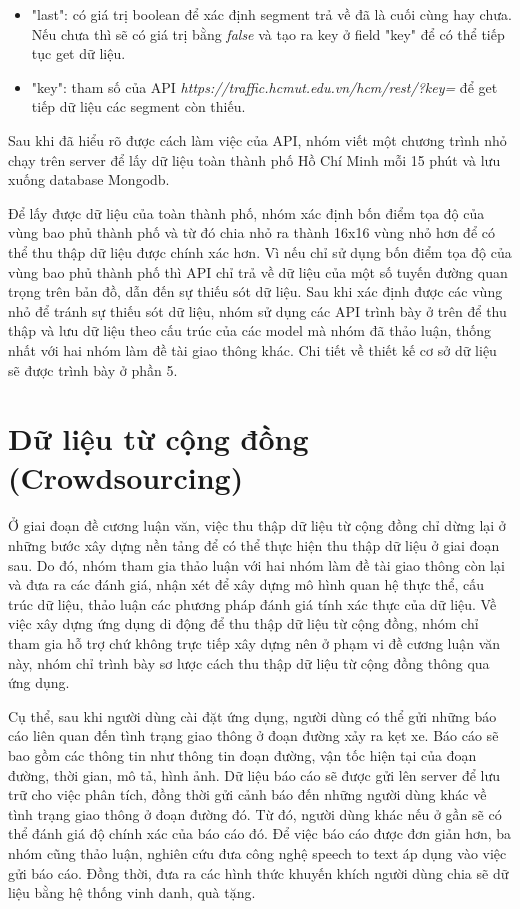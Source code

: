\begin{itemize}
\begin{itemize}
    \item "last": có giá trị boolean để xác định segment trả về đã là cuối cùng hay chưa. Nếu chưa thì sẽ có giá trị bằng \textit{false} và tạo ra key ở field "key" để có thể tiếp tục get dữ liệu.
    \item "key": tham số của API \textit{https://traffic.hcmut.edu.vn/hcm/rest/?key=} để get tiếp dữ liệu các segment còn thiếu.
    \end{itemize}
\end{itemize}
Sau khi đã hiểu rõ được cách làm việc của API, nhóm viết một chương trình nhỏ chạy trên server để lấy dữ liệu toàn thành phố Hồ Chí Minh mỗi 15 phút và lưu xuống database Mongodb.

Để lấy được dữ liệu của toàn thành phố, nhóm xác định bốn điểm tọa độ của vùng bao phủ thành phố và từ đó chia nhỏ ra thành 16x16 vùng nhỏ hơn để có thể thu thập dữ liệu được chính xác hơn. Vì nếu chỉ sử dụng bốn điểm tọa độ của vùng bao phủ thành phố thì API chỉ trả về dữ liệu của một số tuyến đường quan trọng trên bản đồ, dẫn đến sự thiếu sót dữ liệu. Sau khi xác định được các vùng nhỏ để tránh sự thiếu sót dữ liệu, nhóm sử dụng các API trình bày ở trên để thu thập và lưu dữ liệu theo cấu trúc của các model mà nhóm đã thảo luận, thống nhất với hai nhóm làm đề tài giao thông khác. Chi tiết về thiết kế cơ sở dữ liệu sẽ được trình bày ở phần 5.

\section{Dữ liệu từ cộng đồng (Crowdsourcing)}
Ở giai đoạn đề cương luận văn, việc thu thập dữ liệu từ cộng đồng chỉ dừng lại ở những bước xây dựng nền tảng để có thể thực hiện thu thập dữ liệu ở giai đoạn sau. Do đó, nhóm tham gia thảo luận với hai nhóm làm đề tài giao thông còn lại và đưa ra các đánh giá, nhận xét để xây dựng mô hình quan hệ thực thể, cấu trúc dữ liệu, thảo luận các phương pháp đánh giá tính xác thực của dữ liệu. Về việc xây dựng ứng dụng di động để thu thập dữ liệu từ cộng đồng, nhóm chỉ tham gia hỗ trợ chứ không trực tiếp xây dựng nên ở phạm vi đề cương luận văn này, nhóm chỉ trình bày sơ lược cách thu thập dữ liệu từ cộng đồng thông qua ứng dụng.

Cụ thể, sau khi người dùng cài đặt ứng dụng, người dùng có thể gửi những báo cáo liên quan đến tình trạng giao thông ở đoạn đường xảy ra kẹt xe. Báo cáo sẽ bao gồm các thông tin như thông tin đoạn đường, vận tốc hiện tại của đoạn đường, thời gian, mô tả, hình ảnh. Dữ liệu báo cáo sẽ được gửi lên server để lưu trữ cho việc phân tích, đồng thời gửi cảnh báo đến những người dùng khác về tình trạng giao thông ở đoạn đường đó. Từ đó, người dùng khác nếu ở gần sẽ có thể đánh giá độ chính xác của báo cáo đó. Để việc báo cáo được đơn giản hơn, ba nhóm cũng thảo luận, nghiên cứu đưa công nghệ speech to text áp dụng vào việc gửi báo cáo. Đồng thời, đưa ra các hình thức khuyến khích người dùng chia sẽ dữ liệu bằng hệ thống vinh danh, quà tặng.


